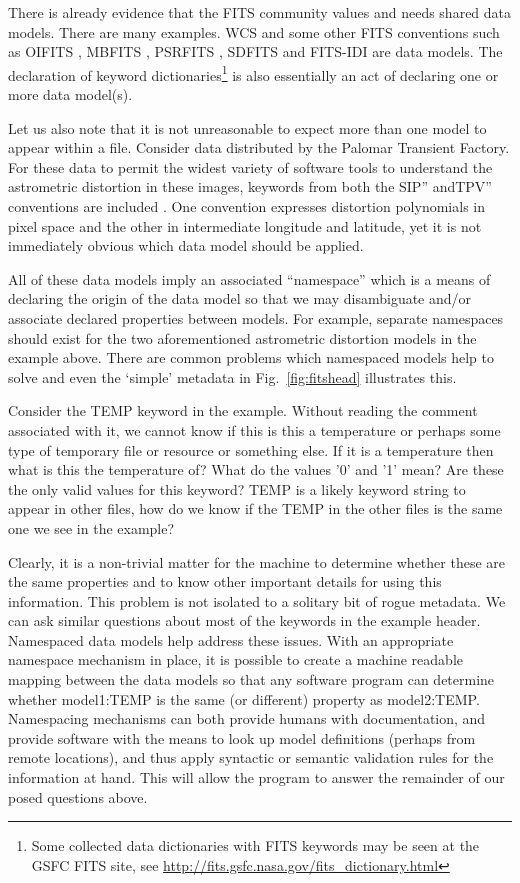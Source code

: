 \documentclass[final,authoryear,5p,times,twocolumn]{elsarticle}
\begin{document}
{{There is already evidence that the FITS community values and needs shared
data models. There are many examples. WCS and some other FITS conventions
such as OIFITS
\citep{2006SPIE.6268E.106T}, MBFITS \citep{2006A&A...454L..25M},
PSRFITS \citep{2004PASA...21..302H},
SDFITS \citep{2000ASPC..216..243G} and FITS-IDI \citep{2011AIPS114}
are data models. The declaration of keyword
dictionaries\footnote{Some collected data dictionaries with FITS
keywords may be seen at the GSFC FITS site, see
\url{http://fits.gsfc.nasa.gov/fits\_dictionary.html}} is also essentially
an act of declaring one or more data model(s).

Let us also note that it is not unreasonable to expect more than one model 
to appear within a file. Consider data distributed by the Palomar Transient 
Factory.  For these data to permit the widest
variety of software tools to understand the astrometric distortion in these
images, keywords from both the SIP'' andTPV'' conventions are included
\citep{2006SPIE.6268E.106T}.
One convention expresses distortion polynomials in pixel space and the
other in intermediate longitude and latitude, yet it is not immediately
obvious which data model should be applied.
 

All of these data models imply an associated ``namespace'' which is
a means of declaring the origin of the data model so that we may
disambiguate and/or associate declared properties between models.
For example, separate namespaces should exist for the two aforementioned 
astrometric distortion models in the example above.
There are common problems which namespaced models help to solve and even
the `simple' metadata in Fig.~\ref{fig:fitshead} illustrates this.


Consider the TEMP keyword in the example. Without reading the comment
associated with it, we cannot know if this is this a temperature or perhaps
some type of temporary file or resource or something else. If it is a
temperature then what is this the temperature of? What do the values '0'
and '1' mean? Are these the only valid values for this keyword?  TEMP is
a likely keyword string to appear in other files, how do we know if the
TEMP in the other files is the same one we see in the example?


Clearly, it is a non-trivial matter for the machine to determine whether
these are the same properties and to know other important details for using
this information. This problem is not isolated to a solitary bit
of rogue metadata. We can ask similar questions about most of the keywords
in the example header. Namespaced data models help address these issues. With
an appropriate namespace mechanism in place, it is possible to create a
machine readable mapping between the data models so that any software program
can determine whether model1:TEMP is the same (or different) property as
model2:TEMP. 
Namespacing mechanisms can both provide humans with documentation, and 
provide software with the means to look up model definitions (perhaps from 
remote locations), and thus apply syntactic or semantic validation rules 
for the information at hand.  This will allow the program to
answer the remainder of our posed questions above.


}}
\end{document}
